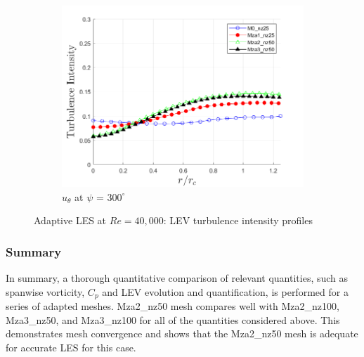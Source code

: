 \begin{figure}[H]
\begin{subfigure}[b]{0.475\textwidth}
		\centering
		\includegraphics[width=1\textwidth]{figures/zonal_adapt_results/LEV/u_theta/TI_phase_300.png}
		\caption{$u_\theta$ at $\psi$ = $300^\circ$}
		\label{fig:zonal_TI_300}
	\end{subfigure}
	\caption{ Adaptive LES at $Re=40,000$: LEV turbulence intensity profiles}
	\label{fig:zonal_TI_plots_LEV}
\end{figure}

\subsubsection{Summary}
In summary, a thorough quantitative comparison of relevant quantities, such as spanwise vorticity, $C_p$ and LEV evolution and quantification, is performed for a series of adapted meshes. Mza2\_nz50 mesh compares well with Mza2\_nz100, Mza3\_nz50, and Mza3\_nz100 for all of the quantities considered above. This demonstrates mesh convergence and shows that the Mza2\_nz50 mesh is adequate for accurate LES for this case.